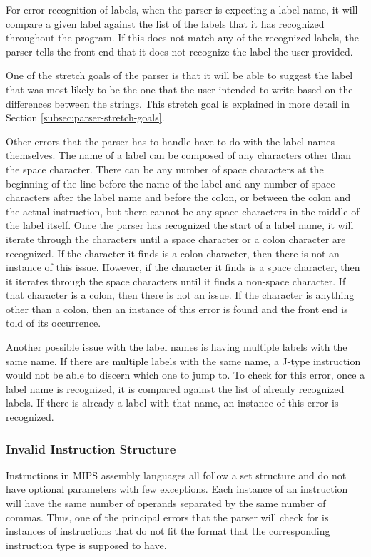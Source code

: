 \documentclass[
    paper=letter,
    parskip=half,
    fontsize=12pt,
    titlepage=firstiscover,
    toc=bibliography,
    numbers=endperiod
]{scrartcl}
\begin{document}
For error recognition of labels, when the parser is expecting a label
name, it will compare a given label against the list of the labels that
it has recognized throughout the program. If this does not match any of
the recognized labels, the parser tells the front end that it does not
recognize the label the user provided.

One of the stretch goals of the parser is that it will be able to
suggest the label that was most likely to be the one that the user
intended to write based on the differences between the strings. This
stretch goal is explained in more detail in Section
\ref{subsec:parser-stretch-goals}.

Other errors that the parser has to handle have to do with the label
names themselves. The name of a label can be composed of any characters
other than the space character. There can be any number of space
characters at the beginning of the line before the name of the label and
any number of space characters after the label name and before the
colon, or between the colon and the actual instruction, but there cannot
be any space characters in the middle of the label itself. Once the
parser has recognized the start of a label name, it will iterate through
the characters until a space character or a colon character are
recognized. If the character it finds is a colon character, then there
is not an instance of this issue. However, if the character it finds is
a space character, then it iterates through the space characters until
it finds a non-space character. If that character is a colon, then there
is not an issue. If the character is anything other than a colon, then
an instance of this error is found and the front end is told of its
occurrence.

Another possible issue with the label names is having multiple labels
with the same name. If there are multiple labels with the same name, a
J-type instruction would not be able to discern which one to jump to. To
check for this error, once a label name is recognized, it is compared
against the list of already recognized labels. If there is already a
label with that name, an instance of this error is recognized.

\subsubsection{Invalid Instruction Structure}

Instructions in MIPS assembly languages all follow a set structure and
do not have optional parameters with few exceptions. Each instance of an
instruction will have the same number of operands separated by the same
number of commas. Thus, one of the principal errors that the parser will
check for is instances of instructions that do not fit the format that
the corresponding instruction type is supposed to have.
\end{document}
